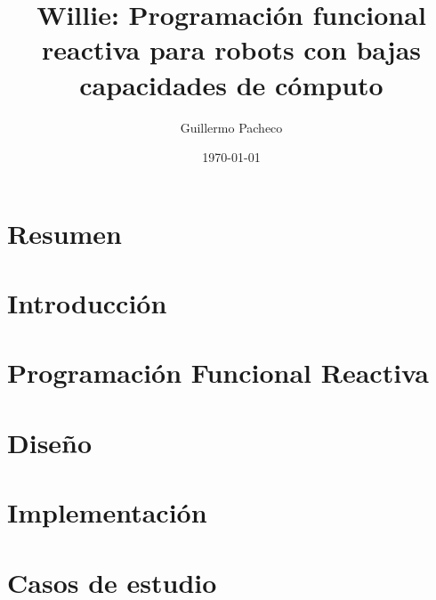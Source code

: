 \documentclass[12pt,a4paper,spanish]{book}
\newcommand{\frob}{Willie}
\begin{document}
\title{\frob: Programación funcional reactiva para robots con bajas capacidades de cómputo}
\author{Guillermo Pacheco}
\date{\today}

\maketitle


\chapter*{Resumen}



\cleardoublepage
{} %
\tableofcontents

\cleardoublepage
{} %
\listoffigures

\cleardoublepage
{} %
\listoftables

\chapter{Introducción}


\chapter{Programación Funcional Reactiva}


\chapter{Diseño}


\chapter{Implementación}


\chapter{Casos de estudio}

\end{document}
